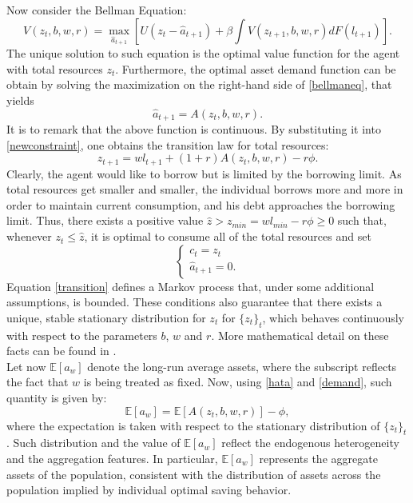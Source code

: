 \documentclass[12pt]{article}
\begin{document}
Now consider the Bellman Equation:
\begin{equation}
\label{bellmaneq}
V\left(z_t, b, w, r \right) = \max_{\hat{a}_{t+1}}\left[U\left(z_t - \hat{a}_{t+1}\right) + \beta \int V(z_{t+1},b, w,r)dF(l_{t+1}) \right].
\end{equation}
The unique solution to such equation is the optimal value function for the agent with total resources $z_t$. Furthermore, the optimal asset demand function can be obtain by solving the maximization on the right-hand side of \ref{bellmaneq}, that yields
\begin{equation}
\label{demand}
\hat{a}_{t+1} = A(z_t, b, w, r).
\end{equation}
It is to remark that the above function is continuous. By substituting it into \ref{newconstraint}, one obtains the transition law for total resources:
\begin{equation}
\label{transition}
z_{t+1} = wl_{t+1} + (1+r)A(z_t, b, w, r) - r\phi.
\end{equation}
Clearly, the agent would like to borrow but is limited by the borrowing limit. As total resources get smaller and smaller, the individual borrows more and more in order to maintain current consumption, and his debt approaches the borrowing limit. Thus, there exists a positive value $\hat{z}>z_{min}=wl_{min} - r\phi \geq 0$ such that, whenever $z_t \leq \hat{z}$, it is optimal to consume all of the total resources and set
\begin{equation*}
\begin{cases}
c_t = z_t \\
\hat{a}_{t+1} = 0.
\end{cases}
\end{equation*}
Equation \ref{transition} defines a Markov process that, under some additional assumptions, is bounded. These conditions also guarantee that there exists a unique, stable stationary distribution for $z_t$ for $\{z_t\}_t$, which behaves continuously with respect to the parameters $b$, $w$ and $r$. More mathematical detail on these facts can be found in \cite{aiya93}. \\
Let now $\mathbb E\left[ a_w \right]$ denote the long-run average assets, where the subscript reflects the fact that $w$ is being treated as fixed. Now, using \ref{hata} and \ref{demand}, such quantity is given by:
\begin{equation}
\mathbb E\left[a_w \right] = \mathbb E \left[A(z_t, b, w, r)\right] - \phi,
\end{equation}
where the expectation is taken with respect to the stationary distribution of $\{z_t\}_t$. Such distribution and the value of $\mathbb E\left[a_w \right]$ reflect the endogenous heterogeneity and the aggregation features. In particular, $\mathbb E\left[a_w \right]$ represents the aggregate assets of the population, consistent with the distribution of assets across the population implied by individual optimal saving behavior. \\
\end{document}
